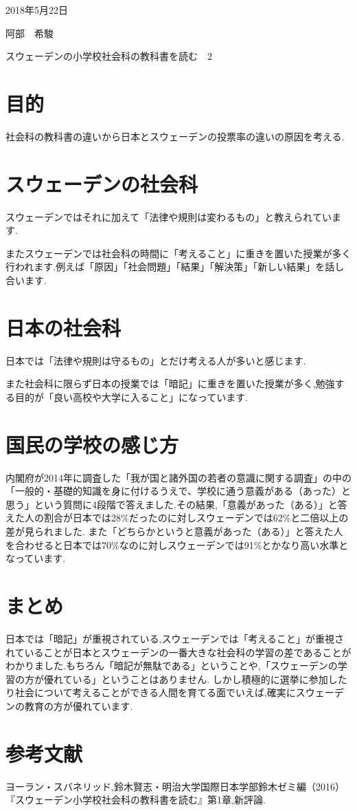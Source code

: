 \documentclass[a4j,10pt]{jsarticle}
\begin{document}
\begin{flushright} %
2018年5月22日

阿部　希駿
\end{flushright}

\begin{center}
\Large{スウェーデンの小学校社会科の教科書を読む　2}
\end{center}

\section{目的}
\label{sec:kihon}
社会科の教科書の違いから日本とスウェーデンの投票率の違いの原因を考える.

\section{スウェーデンの社会科}
\label{sec:kihon}
スウェーデンではそれに加えて「法律や規則は変わるもの」と教えられています.

またスウェーデンでは社会科の時間に「考えること」に重きを置いた授業が多く行われます.例えば「原因」「社会問題」「結果」「解決策」「新しい結果」を話し合います.

\section{日本の社会科}
\label{sec:kihon}
日本では「法律や規則は守るもの」とだけ考える人が多いと感じます.

また社会科に限らず日本の授業では「暗記」に重きを置いた授業が多く,勉強する目的が「良い高校や大学に入ること」になっています.


\section{国民の学校の感じ方}
\label{sec:kihon}
内閣府が2014年に調査した「我が国と諸外国の若者の意識に関する調査」の中の「一般的・基礎的知識を身に付けるうえで、学校に通う意義がある（あった）と思う」という質問に4段階で答えました.その結果,「意義があった（ある）」と答えた人の割合が日本では28\%だったのに対しスウェーデンでは62\%と二倍以上の差が見られました.
また「どちらかというと意義があった（ある）」と答えた人を合わせると日本では70\%なのに対しスウェーデンでは91\%とかなり高い水準となっています.

\section{まとめ}
\label{sec:kihon}
日本では「暗記」が重視されている,スウェーデンでは「考えること」が重視されていることが日本とスウェーデンの一番大きな社会科の学習の差であることがわかりました.もちろん「暗記が無駄である」ということや,「スウェーデンの学習の方が優れている」ということはありません.
しかし積極的に選挙に参加したり社会について考えることができる人間を育てる面でいえば,確実にスウェーデンの教育の方が優れています.

\section{参考文献}
\label{sec:kihon}
ヨーラン・スバネリッド,鈴木賢志・明治大学国際日本学部鈴木ゼミ編（2016）『スウェーデン小学校社会科の教科書を読む』第1章,新評論.
  
\end{document}
